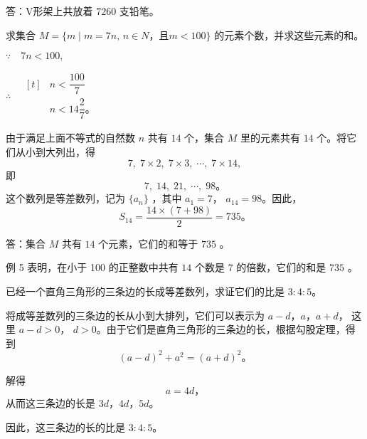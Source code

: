 答：V形架上共放着 $7260$ 支铅笔。

\liti 求集合 $M = \{ m \mid m = 7n ,\, n \in N \text{，且} m < 100 \}$ 的元素个数，并求这些元素的和。

\jie $\because \quad 7n < 100,$

$\therefore \quad \begin{aligned}[t]
     & n < \dfrac{100}{7} \\
     & n < 14\dfrac{2}{7} \text{。}
\end{aligned}$

由于满足上面不等式的自然数 $n$ 共有 $14$ 个，集合 $M$ 里的元素共有 $14$ 个。将它们从小到大列出，得
$$ 7,\; 7 \times 2,\; 7 \times 3,\; \cdots,\; 7 \times 14, $$
即
$$ 7,\; 14,\; 21,\; \cdots,\; 98 \text{。}$$
这个数列是等差数列，记为 $\{a_n\}$ ，其中 $a_1 = 7$， $a_{14} = 98$。因此，
$$ S_{14} = \dfrac{14 \times (7 + 98)}{2} = 735 \text{。} $$

答：集合 $M$ 共有 $14$ 个元素，它们的和等于 $735$ 。

例 5 表明，在小于 100 的正整数中共有 $14$ 个数是 $7$ 的倍数，它们的和是 $735$ 。

\liti 已经一个直角三角形的三条边的长成等差数列，求证它们的比是 $3:4:5$。

\zhengming 将成等差数列的三条边的长从小到大排列，它们可以表示为 $a - d$，$a$，$a + d$，
这里 $a - d > 0$， $d > 0$。由于它们是直角三角形的三条边的长，根据勾股定理，得到
$$ (a - d)^2 + a^2 = (a + d)^2 \text{。}$$

解得
$$ a = 4d \text{，}$$
从而这三条边的长是 $3d$，$4d$，$5d$。

因此，这三条边的长的比是 $3:4:5$。

\lianxi
\begin{xiaotis}
\setcounter{cntxiaoti}{0}

\begin{xiaoxiaotis}





\end{xiaoxiaotis}

\xiaoti{}

\begin{xiaoxiaotis}

    \vspace{-1.6em} \begin{minipage}{0.9\textwidth}
    \end{minipage}


\end{xiaoxiaotis}
\end{xiaotis}






